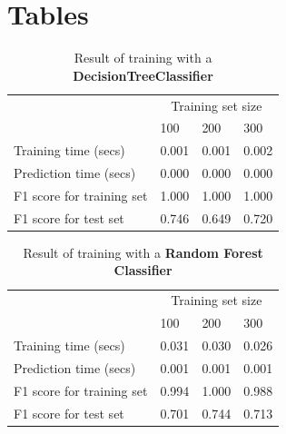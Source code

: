 \documentclass[12pt]{article}
\begin{document}
\section*{Tables}

\setlength{\extrarowheight}{1.5pt}
\begin{table}[!htbp]
\caption{Result of training with a \textbf{DecisionTreeClassifier}} %
\centering %
\begin{tabular}{|p{6cm}|p{1.5cm}|p{1.5cm}|p{1.5cm}|} %
\hline %
& \multicolumn{3}{c|}{Training set size}\\[5pt]
\cline{2-4} 
& 100 & 200 & 300\\[0.5ex]
\hline %

Training time (secs)          &0.001&0.001&0.002\\
Prediction time (secs)        &0.000&0.000&0.000\\
F1 score for training set     &1.000&1.000&1.000\\
F1 score for test set         &0.746&0.649&0.720\\

\hline %
\end{tabular}
\label{decisionTreeTable}
\end{table}

\setlength{\extrarowheight}{1.5pt}
\begin{table}[!htbp]
\caption{Result of training with a \textbf{Random Forest Classifier}} %
\centering %
\begin{tabular}{|p{6cm}|p{1.5cm}|p{1.5cm}|p{1.5cm}|} %
\hline %
& \multicolumn{3}{c|}{Training set size}\\[5pt]
\cline{2-4} 
& 100 & 200 & 300\\[0.5ex]
\hline %

Training time (secs)          &0.031&0.030&0.026\\
Prediction time (secs)        &0.001&0.001&0.001\\
F1 score for training set     &0.994&1.000&0.988\\
F1 score for test set         &0.701&0.744&0.713\\
\hline %
\end{tabular}
\label{randomForestClassifierTable}
\end{table}
\end{document}
